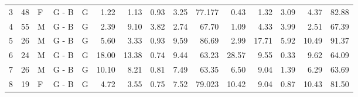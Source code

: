 \begin{landscape}
\begin{table}[htbp]
\begin{tabular}{lllllrrrrrrrrrr}
3                                        & 48                                      & F                                       & G - B                                    & G                                       & 1.22                   & 1.13                   & 0.93                    & 3.25                    & 77.177                 & 0.43                   & 1.32                   & 3.09                    & 4.37                    & 82.88                  \\
4                                        & 55                                      & M                                       & G - B                                    & G                                       & 2.39                   & 9.10                   & 3.82                    & 2.74                    & 67.70                  & 1.09                   & 4.33                   & 3.99                    & 2.51                    & 67.39                  \\
5                                        & 26                                      & M                                       & G - B                                    & G                                       & 5.60                   & 3.33                   & 0.93                    & 9.59                    & 86.69                  & 2.99                   & 17.71                  & 5.92                    & 10.49                   & 91.37                  \\
6                                        & 24                                      & M                                       & G - B                                    & G                                       & 18.00                  & 13.38                  & 0.74                    & 9.44                    & 63.23                  & 28.57                  & 9.55                   & 0.33                    & 9.62                    & 64.09                  \\
7                                        & 26                                      & M                                       & G - B                                    & G                                       & 10.10                  & 8.21                   & 0.81                    & 7.49                    & 63.35                  & 6.50                   & 9.04                   & 1.39                    & 6.29                    & 63.69                  \\
8                                        & 19                                      & F                                       & G - B                                    & G                                       & 4.72                   & 3.55                   & 0.75                    & 7.52                    & 79.023                 & 10.42                  & 9.04                   & 0.87                    & 10.43                   & 81.50                  \\

\end{tabular}
\end{table}
\end{landscape}
